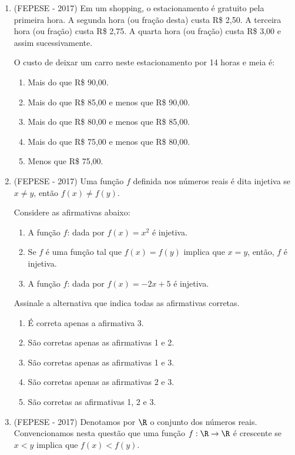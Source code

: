 \begin{enumerate}
 \item (FEPESE - 2017) Em um shopping, o estacionamento é gratuito pela primeira hora. A segunda hora (ou fração desta) custa R\$ 2,50. A terceira hora (ou fração) custa R\$ 2,75. A quarta hora (ou fração) custa R\$ 3,00 e assim sucessivamente.

 O custo de deixar um carro neste estacionamento por 14 horas e meia é:
 \begin{enumerate}
  \item Mais do que R\$ 90,00.
  \item Mais do que R\$ 85,00 e menos que R\$ 90,00.
  \item Mais do que R\$ 80,00 e menos que R\$ 85,00.
  \item Mais do que R\$ 75,00 e menos que R\$ 80,00.
  \item Menos que R\$ 75,00.
 \end{enumerate}

 \item (FEPESE - 2017) Uma função $f$ definida nos números reais é dita injetiva se $x \neq y$, então $f(x) \neq f(y)$.

Considere as afirmativas abaixo:
\begin{enumerate}[1.]
 \item A função $f$:  dada por $f(x) = x^2$ é injetiva.

 \item Se $f$ é uma função tal que $f(x) = f(y)$ implica que $x = y$, então, $f$ é injetiva.

 \item A função $f$:  dada por $f(x) = -2x + 5$ é injetiva.
 \end{enumerate}
 Assinale a alternativa que indica todas as afirmativas corretas.
 \begin{enumerate}
 \item É correta apenas a afirmativa 3.
 \item São corretas apenas as afirmativas 1 e 2.
 \item São corretas apenas as afirmativas 1 e 3.
 \item São corretas apenas as afirmativas 2 e 3.
 \item São corretas as afirmativas 1, 2 e 3.
 \end{enumerate}

 \item (FEPESE - 2017) Denotamos por $\R$ o conjunto dos números reais. Convencionamos nesta questão que uma função $f : \R \rightarrow \R$ é crescente se $x < y$ implica que $f(x) < f(y)$.


\end{enumerate}

